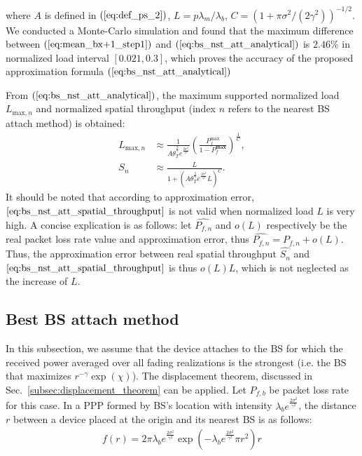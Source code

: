 where $A$ is defined in $(\ref{eq:def_ps_2})$, $L=p\lambda_{m}/\lambda_{b}$, $C= \left( 1 +\pi \sigma^2 / (2\gamma^2) \right)^{-1/2}$. We conducted a Monte-Carlo simulation and found that the maximum difference between $(\ref{eq:mean_bx+1_step1})$ and $(\ref{eq:bs_nst_att_analytical})$ is $2.46\%$ in normalized load interval $\left[ 0.021, 0.3\right] $, which proves the accuracy of the proposed approximation formula $(\ref{eq:bs_nst_att_analytical})$


From $(\ref{eq:bs_nst_att_analytical})$,  the maximum supported normalized load $L_{\text{max},n}$ and normalized spatial throughput (index $n$ refers to the nearest BS attach method) is obtained:
\begin{align}
\label{eq:bs_nst_att_max_load}
L_{\text{max},n} & \approx \frac{1}{A \theta_{T}^{\frac{2}{\gamma}} e^{\frac{2\sigma^2}{\gamma^2}} } 
\left(  \frac{P_{f}^{\text{max}}}{1 - P_{f}^{\textbf{max}}} \right) ^{\frac{1}{C}}, \\
\label{eq:bs_nst_att_spatial_throughput}
S_{n} & \approx  \frac{L}{1 + \left( A \theta_{T}^{\frac{2}{\gamma}} e^{\frac{2\sigma^2}{\gamma^2}}  L\right) ^{C} }.
\end{align}
It should be noted that according to approximation error, $\eqref{eq:bs_nst_att_spatial_throughput}$ is not valid when normalized load $L$ is very high. A concise explication is as follows: let $\hat{P_{f,n}}$ and $o(L)$ respectively be the real packet loss rate value and approximation error, thus $\hat{P_{f,n}} = P_{f,n} + o(L)$. Thus, the approximation error between real spatial throughput $\hat{S_n}$ and $\eqref{eq:bs_nst_att_spatial_throughput}$ is thus $ o(L) L$, which is not neglected as the increase of $L$.

\subsection{Best BS attach method}
In this subsection, we assume that the device attaches to the BS for which the received power averaged over all fading realizations is the strongest (i.e. the BS that maximizes $r^{-\gamma}\exp(\chi)$). The displacement theorem, discussed in Sec.~\ref{subsec:displacement_theorem} can be applied. Let $P_{f,b} $ be packet loss rate for this case. In a PPP formed by BS's location with intensity $\lambda_b e^{\frac{2\sigma^2}{\gamma^2}}$, the distance $r$ between a device placed at the origin and its nearest BS is as follows:
\begin{align}
	\label{eq:pdf_modified_r}
	f(r) = 2 \pi \lambda_b e^{\frac{2\sigma^2}{\gamma^2}}  \exp( -\lambda_b  e^{\frac{2\sigma^2}{\gamma^2}} \pi r^2 ) r 
\end{align}
